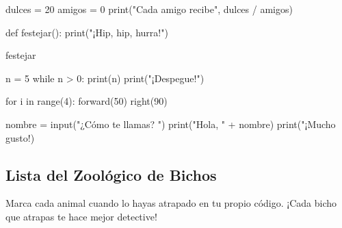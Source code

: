\begin{code}
dulces = 20
amigos = 0
print("Cada amigo recibe", dulces / amigos)
\end{code}
\bzruled

\begin{code}
def festejar():
    print("¡Hip, hip, hurra!")

festejar
\end{code}
\bzruled

\begin{code}
n = 5
while n > 0:
    print(n)
print("¡Despegue!")
\end{code}
\bzruled

\begin{code}
for i in range(4):
    forward(50)
right(90)
\end{code}
\bzruled

\begin{code}
nombre = input("¿Cómo te llamas? ")
print("Hola, " + nombre)
print("¡Mucho gusto!)
\end{code}
\bzruled

\subsection*{Lista del Zoológico de Bichos}

Marca cada animal cuando lo hayas atrapado en tu propio código. ¡Cada bicho que atrapas te hace mejor detective!

